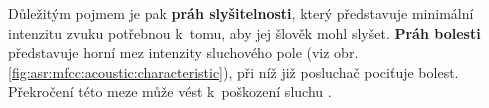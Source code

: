 



Důležitým pojmem je pak \textbf{práh slyšitelnosti}, který představuje minimální intenzitu zvuku potřebnou  k~tomu, aby jej šlověk mohl slyšet.
\textbf{Práh bolesti} představuje horní mez intenzity sluchového pole (viz obr. \ref{fig:asr:mfcc:acoustic:characteristic}), při níž již posluchač pociťuje bolest. Překročení této meze může vést  k~poškození sluchu \cite{Holmes2001}.



